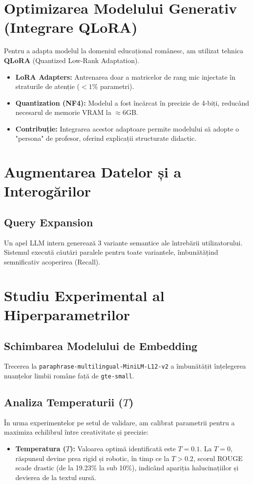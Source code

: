 \documentclass[12pt,a4paper]{report}
\begin{document}
\section{Optimizarea Modelului Generativ (Integrare QLoRA)}
Pentru a adapta modelul la domeniul educațional românesc, am utilizat tehnica \textbf{QLoRA} (Quantized Low-Rank Adaptation).
\begin{itemize}
    \item \textbf{LoRA Adapters:} Antrenarea doar a matricelor de rang mic injectate în straturile de atenție ($<1\%$ parametri).
    \item \textbf{Quantization (NF4):} Modelul a fost încărcat în precizie de 4-biți, reducând necesarul de memorie VRAM la $\approx 6$GB.
    \item \textbf{Contribuție:} Integrarea acestor adaptoare permite modelului să adopte o "persona" de profesor, oferind explicații structurate didactic.
\end{itemize}

\section{Augmentarea Datelor și a Interogărilor}
\subsection{Query Expansion}
Un apel LLM intern generează 3 variante semantice ale întrebării utilizatorului. Sistemul execută căutări paralele pentru toate variantele, îmbunătățind semnificativ acoperirea (Recall).

\section{Studiu Experimental al Hiperparametrilor}

\subsection{Schimbarea Modelului de Embedding}
Trecerea la \texttt{paraphrase-multilingual-MiniLM-L12-v2} a îmbunătățit înțelegerea nuanțelor limbii române față de \texttt{gte-small}.

\subsection{Analiza Temperaturii ($T$)}
În urma experimentelor pe setul de validare, am calibrat parametrii pentru a maximiza echilibrul între creativitate și precizie:
\begin{itemize}
    \item \textbf{Temperatura ($T$):} Valoarea optimă identificată este $T=0.1$. La $T=0$, răspunsul devine prea rigid și robotic, în timp ce la $T > 0.2$, scorul ROUGE scade drastic (de la 19.23\% la sub 10\%), indicând apariția halucinațiilor și devierea de la textul sursă.
\end{itemize}
\end{document}
